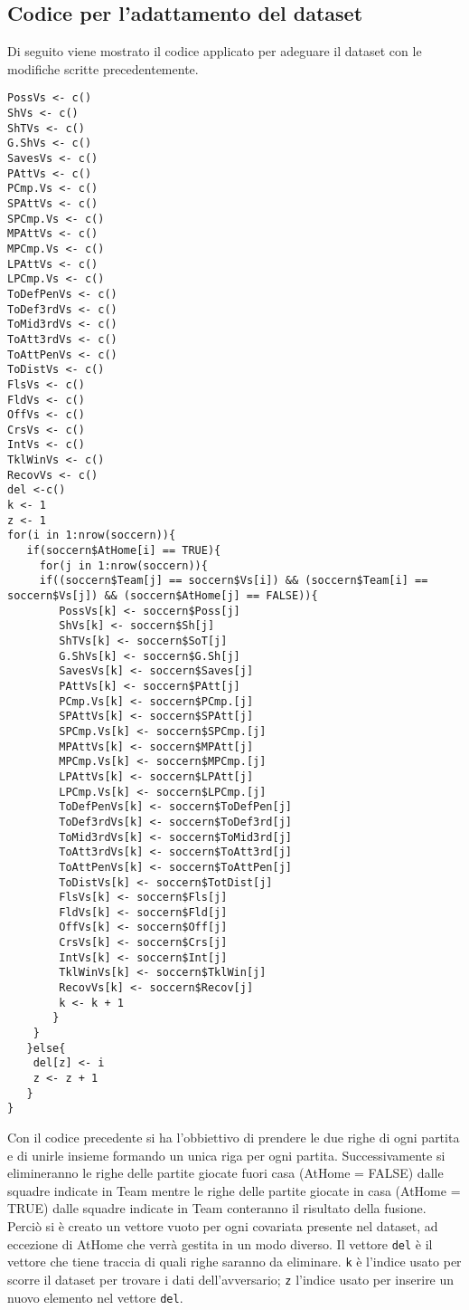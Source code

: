 \subsection{Codice per l'adattamento del dataset}
Di seguito viene mostrato il codice applicato per adeguare il dataset con le modifiche scritte precedentemente.

\begin{lstlisting}
PossVs <- c()
ShVs <- c()
ShTVs <- c()
G.ShVs <- c()
SavesVs <- c()
PAttVs <- c()
PCmp.Vs <- c()
SPAttVs <- c()
SPCmp.Vs <- c()
MPAttVs <- c()
MPCmp.Vs <- c()
LPAttVs <- c()
LPCmp.Vs <- c()
ToDefPenVs <- c()
ToDef3rdVs <- c()
ToMid3rdVs <- c()
ToAtt3rdVs <- c()
ToAttPenVs <- c()
ToDistVs <- c()
FlsVs <- c()
FldVs <- c()
OffVs <- c()
CrsVs <- c()
IntVs <- c()
TklWinVs <- c()
RecovVs <- c()
del <-c()
k <- 1
z <- 1
for(i in 1:nrow(soccern)){
   if(soccern$AtHome[i] == TRUE){
     for(j in 1:nrow(soccern)){
	 if((soccern$Team[j] == soccern$Vs[i]) && (soccern$Team[i] == soccern$Vs[j]) && (soccern$AtHome[j] == FALSE)){
		PossVs[k] <- soccern$Poss[j]
		ShVs[k] <- soccern$Sh[j]
		ShTVs[k] <- soccern$SoT[j]
		G.ShVs[k] <- soccern$G.Sh[j]
		SavesVs[k] <- soccern$Saves[j]
		PAttVs[k] <- soccern$PAtt[j]
		PCmp.Vs[k] <- soccern$PCmp.[j]
		SPAttVs[k] <- soccern$SPAtt[j]
		SPCmp.Vs[k] <- soccern$SPCmp.[j]
		MPAttVs[k] <- soccern$MPAtt[j]
		MPCmp.Vs[k] <- soccern$MPCmp.[j]
		LPAttVs[k] <- soccern$LPAtt[j]
		LPCmp.Vs[k] <- soccern$LPCmp.[j]
		ToDefPenVs[k] <- soccern$ToDefPen[j]
		ToDef3rdVs[k] <- soccern$ToDef3rd[j]
		ToMid3rdVs[k] <- soccern$ToMid3rd[j]
		ToAtt3rdVs[k] <- soccern$ToAtt3rd[j]
		ToAttPenVs[k] <- soccern$ToAttPen[j]
		ToDistVs[k] <- soccern$TotDist[j]
		FlsVs[k] <- soccern$Fls[j]
		FldVs[k] <- soccern$Fld[j]
		OffVs[k] <- soccern$Off[j]
		CrsVs[k] <- soccern$Crs[j]
		IntVs[k] <- soccern$Int[j]
		TklWinVs[k] <- soccern$TklWin[j]
		RecovVs[k] <- soccern$Recov[j]
		k <- k + 1
	   }      
	}
   }else{
	del[z] <- i
	z <- z + 1
   }
}
\end{lstlisting}
\bigskip
Con il codice precedente si ha l'obbiettivo di prendere le due righe di ogni partita e di unirle insieme formando un unica riga per ogni partita. Successivamente si elimineranno le righe delle partite giocate fuori casa (\textsf{AtHome} = FALSE) dalle squadre indicate in \textsf{Team} mentre le righe delle partite giocate in casa (\textsf{AtHome} = TRUE) dalle squadre indicate in \textsf{Team} conteranno il risultato della fusione.\\
Perciò si è creato un vettore vuoto per ogni covariata presente nel dataset, ad eccezione di \textsf{AtHome} che verrà gestita in un modo diverso. Il vettore \texttt{del} è il vettore che tiene traccia di quali righe saranno da eliminare. \texttt{k} è l'indice usato per scorre il dataset per trovare i dati dell'avversario; \texttt{z} l'indice usato per inserire un nuovo elemento nel vettore \texttt{del}.\\
